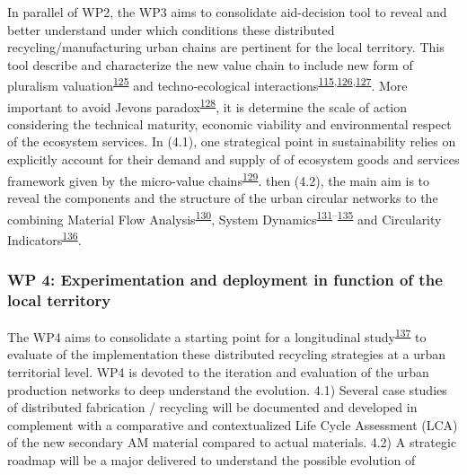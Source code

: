 \documentclass[
  12pt,
  a4paperpaper,
  onecolumn]{article}
\begin{document}
In parallel of WP2, the WP3 aims to consolidate aid-decision tool to
reveal and better understand under which conditions these distributed
recycling/manufacturing urban chains are pertinent for the local
territory. This tool describe and characterize the new value chain to
include new form of pluralism
valuation\textsuperscript{\protect\hyperlink{ref-gunton2022}{125}} and
techno-ecological
interactions\textsuperscript{\protect\hyperlink{ref-Saladini2018}{115},\protect\hyperlink{ref-Liu2020c}{126},\protect\hyperlink{ref-Liu2019g}{127}}.
More important to avoid Jevons
paradox\textsuperscript{\protect\hyperlink{ref-giampietro2018}{128}}, it
is determine the scale of action considering the technical maturity,
economic viability and environmental respect of the ecosystem services.
In (4.1), one strategical point in sustainability relies on explicitly
account for their demand and supply of of ecosystem goods and services
framework given by the micro-value
chains\textsuperscript{\protect\hyperlink{ref-Diwekar2021}{129}}. then
(4.2), the main aim is to reveal the components and the structure of the
urban circular networks to the combining Material Flow
Analysis\textsuperscript{\protect\hyperlink{ref-saidani2021}{130}},
System
Dynamics\textsuperscript{\protect\hyperlink{ref-kuo2021}{131}--\protect\hyperlink{ref-perez-perez2021}{135}}
and Circularity
Indicators\textsuperscript{\protect\hyperlink{ref-saidani2019}{136}}.

\hypertarget{wp-4-experimentation-and-deployment-in-function-of-the-local-territory}{%
\subsubsection{WP 4: Experimentation and deployment in function of the
local
territory}\label{wp-4-experimentation-and-deployment-in-function-of-the-local-territory}}

The WP4 aims to consolidate a starting point for a longitudinal
study\textsuperscript{\protect\hyperlink{ref-langley2013}{137}} to
evaluate of the implementation these distributed recycling strategies at
a urban territorial level. WP4 is devoted to the iteration and
evaluation of the urban production networks to deep understand the
evolution. 4.1) Several case studies of distributed fabrication /
recycling will be documented and developed in complement with a
comparative and contextualized Life Cycle Assessment (LCA) of the new
secondary AM material compared to actual materials. 4.2) A strategic
roadmap will be a major delivered to understand the possible evolution
of
\end{document}
